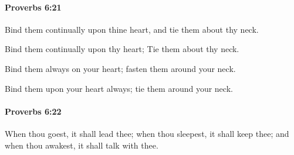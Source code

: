 		\paragraph{Proverbs 6:21} %
			\label{PROVERBS-6-21}

			Bind them continually upon thine heart, and tie them about thy neck.

			\begin{versebox}
					\item[BHS] 
					\item[ASV] Bind them continually upon thy heart; Tie them about thy neck.
					\item[NIV] Bind them always on your heart; fasten them around your neck.
					\item[NRSV] Bind them upon your heart always; tie them around your neck.
			\end{versebox}

		\paragraph{Proverbs 6:22} %
			\label{PROVERBS-6-22}

			When thou goest, it shall lead thee; when thou sleepest, it shall keep thee; and when thou awakest, it shall talk with thee.

